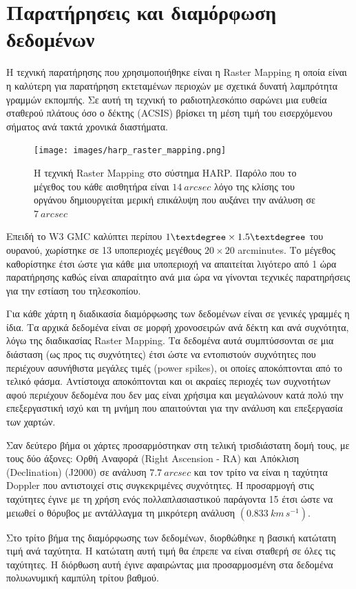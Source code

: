 \documentclass[a4paper,12pt]{memoir}
\begin{document}
\section{Παρατήρησεις και διαμόρφωση δεδομένων}
Η τεχνική παρατήρησης που χρησιμοποιήθηκε είναι η Raster Mapping η οποία είναι η καλύτερη για παρατήρηση εκτεταμένων περιοχών με σχετικά δυνατή λαμπρότητα γραμμών εκπομπής. Σε αυτή τη τεχνική το ραδιοτηλεσκόπιο σαρώνει μια ευθεία σταθερού πλάτους όσο ο δέκτης (ACSIS) βρίσκει τη μέση τιμή του εισερχόμενου σήματος ανά τακτά χρονικά διαστήματα. 


\begin{figure}[h]
	\centering
	\texttt{[image: images/harp\_raster\_mapping.png]}
	\caption{Η τεχνική Raster Mapping στο σύστημα HARP. Παρόλο που το μέγεθος του κάθε αισθητήρα είναι $14\ arcsec$ λόγο της κλίσης του οργάνου δημιουργείται μερική επικάλυψη που αυξάνει την ανάλυση σε $7\ arcsec$ }
\end{figure}

Επειδή το W3 GMC καλύπτει περίπου $1 \textdegree \times 1.5 \textdegree$ του ουρανού, χωρίστηκε σε 13 υποπεριοχές μεγέθους $20 \times 20$ arcminutes. Το μέγεθος καθορίστηκε έτσι ώστε για κάθε μια υποπεριοχή να απαιτείται λιγότερο από 1 ώρα παρατήρησης καθώς είναι απαραίτητο ανά μια ώρα να γίνονται τεχνικές παρατηρήσεις για την εστίαση του τηλεσκοπίου. 

Για κάθε χάρτη η διαδικασία διαμόρφωσης των δεδομένων είναι σε γενικές γραμμές η ίδια. Τα αρχικά δεδομένα είναι σε μορφή χρονοσειρών ανά δέκτη και ανά συχνότητα, λόγω της διαδικασίας Raster Mapping. Τα δεδομένα αυτά συμπτύσσονται σε μια διάσταση (ως προς τις συχνότητες) έτσι ώστε να εντοπιστούν συχνότητες που περιέχουν ασυνήθιστα μεγάλες τιμές (power spikes), οι οποίες αποκόπτονται από το τελικό φάσμα. Αντίστοιχα αποκόπτονται και οι ακραίες περιοχές των συχνοτήτων αφού περιέχουν δεδομένα που δεν μας είναι χρήσιμα και μεγαλώνουν κατά πολύ την επεξεργαστική ισχύ και τη μνήμη που απαιτούνται για την ανάλυση και επεξεργασία των χαρτών.

Σαν δεύτερο βήμα οι χάρτες προσαρμόστηκαν στη τελική τρισδιάστατη δομή τους, με τους δύο άξονες: Ορθή Αναφορά (Right Ascension - RA) και Απόκλιση (Declination) (J2000) σε ανάλυση $7.7\ arcsec$ και τον τρίτο να είναι η ταχύτητα Doppler που αντιστοιχεί στις συγκεκριμένες συχνότητες. Η προσαρμογή στις ταχύτητες έγινε με τη χρήση ενός πολλαπλασιαστικού παράγοντα 15 έτσι ώστε να μειωθεί ο θόρυβος με αντάλλαγμα τη μικρότερη ανάλυση $(0.833\ km\, s^{-1})$. 

Στο τρίτο βήμα της διαμόρφωσης των δεδομένων, διορθώθηκε η βασική κατώτατη τιμή ανά ταχύτητα. Η κατώτατη αυτή τιμή θα έπρεπε να είναι σταθερή σε όλες τις ταχύτητες. Η διόρθωση αυτή έγινε αφαιρώντας μια προσαρμοσμένη στα δεδομένα πολυωνυμική καμπύλη τρίτου βαθμού.
\end{document}
